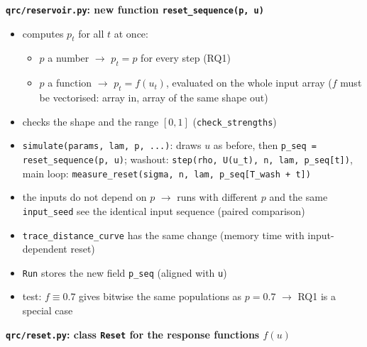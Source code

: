 \textbf{\texttt{qrc/reservoir.py}: new function \texttt{reset\_sequence(p, u)}}
\begin{itemize}
    \item computes $p_t$ for all $t$ at once:
    \begin{itemize}
        \item $p$ a number $\to$ $p_t = p$ for every step (RQ1)
        \item $p$ a function $\to$ $p_t = f(u_t)$, evaluated on the whole input array ($f$ must be vectorised:
        array in, array of the same shape out)
    \end{itemize}
    \item checks the shape and the range $[0, 1]$ (\texttt{check\_strengths})
    \item \texttt{simulate(params, lam, p, ...)}: draws $u$ as before, then \texttt{p\_seq = reset\_sequence(p, u)};
    washout: \texttt{step(rho, U(u\_t), n, lam, p\_seq[t])}, main loop:
    \texttt{measure\_reset(sigma, n, lam, p\_seq[T\_wash + t])}
    \item the inputs do not depend on $p$ $\to$ runs with different $p$ and the same \texttt{input\_seed} see the
    identical input sequence (paired comparison)
    \item \texttt{trace\_distance\_curve} has the same change (memory time with input-dependent reset)
    \item \texttt{Run} stores the new field \texttt{p\_seq} (aligned with \texttt{u})
    \item test: $f \equiv 0.7$ gives bitwise the same populations as $p = 0.7$ $\to$ RQ1 is a special case
\end{itemize}

\textbf{\texttt{qrc/reset.py}: class \texttt{Reset} for the response functions $f(u)$}

